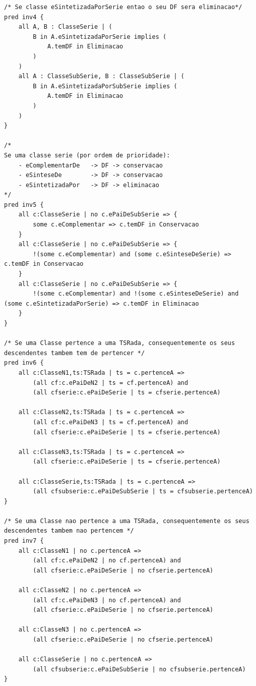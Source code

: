\documentclass{article}
\begin{document}
\begin{lstlisting}[language=alloy, frame=single]
/* Se classe eSintetizadaPorSerie entao o seu DF sera eliminacao*/
pred inv4 {
    all A, B : ClasseSerie | (
        B in A.eSintetizadaPorSerie implies (
            A.temDF in Eliminacao
        )
    )
    all A : ClasseSubSerie, B : ClasseSubSerie | (
        B in A.eSintetizadaPorSubSerie implies (
            A.temDF in Eliminacao
        )
    )
}

/* 
Se uma classe serie (por ordem de prioridade):
    - eComplementarDe   -> DF -> conservacao
    - eSinteseDe        -> DF -> conservacao
    - eSintetizadaPor   -> DF -> eliminacao
*/
pred inv5 {
	all c:ClasseSerie | no c.ePaiDeSubSerie => {
		some c.eComplementar => c.temDF in Conservacao
	}
	all c:ClasseSerie | no c.ePaiDeSubSerie => {
		!(some c.eComplementar) and (some c.eSinteseDeSerie) => c.temDF in Conservacao
	}
	all c:ClasseSerie | no c.ePaiDeSubSerie => {
		!(some c.eComplementar) and !(some c.eSinteseDeSerie) and (some c.eSintetizadaPorSerie) => c.temDF in Eliminacao
	}
}

/* Se uma Classe pertence a uma TSRada, consequentemente os seus descendentes tambem tem de pertencer */
pred inv6 {
	all c:ClasseN1,ts:TSRada | ts = c.pertenceA =>
		(all cf:c.ePaiDeN2 | ts = cf.pertenceA) and
        (all cfserie:c.ePaiDeSerie | ts = cfserie.pertenceA)

    all c:ClasseN2,ts:TSRada | ts = c.pertenceA =>
        (all cf:c.ePaiDeN3 | ts = cf.pertenceA) and
        (all cfserie:c.ePaiDeSerie | ts = cfserie.pertenceA)

    all c:ClasseN3,ts:TSRada | ts = c.pertenceA =>
        (all cfserie:c.ePaiDeSerie | ts = cfserie.pertenceA) 
    
    all c:ClasseSerie,ts:TSRada | ts = c.pertenceA =>
        (all cfsubserie:c.ePaiDeSubSerie | ts = cfsubserie.pertenceA)
}

/* Se uma Classe nao pertence a uma TSRada, consequentemente os seus descendentes tambem nao pertencem */
pred inv7 {
	all c:ClasseN1 | no c.pertenceA =>
		(all cf:c.ePaiDeN2 | no cf.pertenceA) and
        (all cfserie:c.ePaiDeSerie | no cfserie.pertenceA)

    all c:ClasseN2 | no c.pertenceA =>
        (all cf:c.ePaiDeN3 | no cf.pertenceA) and
        (all cfserie:c.ePaiDeSerie | no cfserie.pertenceA)

    all c:ClasseN3 | no c.pertenceA =>
        (all cfserie:c.ePaiDeSerie | no cfserie.pertenceA) 
    
    all c:ClasseSerie | no c.pertenceA =>
        (all cfsubserie:c.ePaiDeSubSerie | no cfsubserie.pertenceA)
}


\end{lstlisting}
\end{document}

